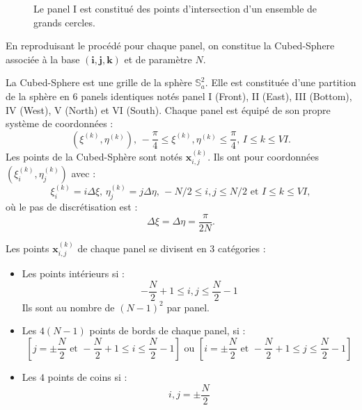 \begin{figure}[htbp]
\begin{center}
\end{center}
\caption{Le panel I est constitué des points d'intersection d'un ensemble de grands cercles.}
\label{fig: panel I}
\end{figure}  

En reproduisant le procédé pour chaque panel, on constitue la Cubed-Sphere associée à la base $(\mathbf{i},\mathbf{j},\mathbf{k})$ et de paramètre $N$.

\begin{definition}
La Cubed-Sphere est une grille de la sphère $\mathbb{S}_a^2$. Elle est constituée d'une partition de la sphère en 6 panels identiques notés panel I (Front), II (East), III (Bottom), IV (West), V (North) et VI (South). Chaque panel est équipé de son propre système de coordonnées :
\begin{equation}
\left( \xi^{(k)}, \eta^{(k)} \right) \text{, } -\dfrac{\pi}{4} \leq \xi^{(k)}, \eta^{(k)} \leq \dfrac{\pi}{4} \text{, } I \leq k \leq VI.
\end{equation}
Les points de la Cubed-Sphère sont notés $\mathbf{x}_{i,j}^{(k)}$. Ils ont pour coordonnées $\left( \xi_i^{(k)}, \eta_j^{(k)}  \right)$ avec :
\begin{equation}
\xi_i^{(k)} = i \Delta \xi \text{, } \eta_j^{(k)} = j \Delta \eta \text{, } -N/2 \leq i, j \leq N/2 \text{ et } I \leq k \leq VI,
\end{equation}
où le pas de discrétisation est :
\begin{equation}
\Delta \xi = \Delta \eta = \dfrac{\pi}{2 N}.
\end{equation}
\end{definition}

Les points $\mathbf{x}_{i,j}^{(k)}$ de chaque panel se divisent en 3 catégories :
\begin{itemize}
\item Les points intérieurs si :
\begin{equation}
- \dfrac{N}{2}+1 \leq i,j \leq \dfrac{N}{2}-1
\end{equation}
Ils sont au nombre de $(N-1)^2$ par panel.
\item Les $4(N-1)$ points de bords de chaque panel, si :
\begin{equation}
\left[ j=\pm \dfrac{N}{2} \text{ et } - \dfrac{N}{2}+1 \leq i \leq \dfrac{N}{2}-1 \right] \text{ ou } \left[ i=\pm \dfrac{N}{2} \text{ et } - \dfrac{N}{2}+1 \leq j \leq \dfrac{N}{2}-1 \right]
\end{equation}
\item Les $4$ points de coins si :
\begin{equation}
i, j = \pm \dfrac{N}{2}
\end{equation}
\end{itemize}



